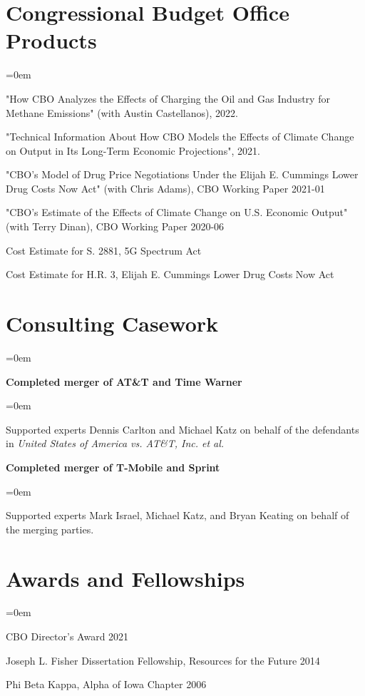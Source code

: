 \documentclass[letterpaper]{article}
\renewenvironment{itemize}{
  \vspace{-0.5em}
  \begin{list}{}{
	\itemsep=0em
    \setlength{\leftmargin}{1.5em}
  }
}{
  \end{list}
}
\begin{document}
\section*{Congressional Budget Office Products}
\begin{itemize}
\item "How CBO Analyzes the Effects of Charging the Oil and Gas Industry for Methane Emissions" (with Austin Castellanos), 2022.
\item "Technical Information About How CBO Models the Effects of Climate Change on Output in Its Long-Term Economic Projections", 2021.
\item "CBO’s Model of Drug Price Negotiations Under the Elijah E. Cummings Lower Drug Costs Now Act" (with Chris Adams), CBO Working Paper 2021-01
\item "CBO’s Estimate of the Effects of Climate Change on U.S. Economic Output" (with Terry Dinan), CBO Working Paper 2020-06
\item Cost Estimate for S. 2881, 5G Spectrum Act
\item Cost Estimate for H.R. 3, Elijah E. Cummings Lower Drug Costs Now Act
\end{itemize}

\section*{Consulting Casework}
\begin{itemize}
\item \textbf{Completed merger of AT\&T and Time Warner}
\begin{itemize}
\item Supported experts Dennis Carlton and Michael Katz on behalf of the defendants in \textit{United States of America vs. AT\&T, Inc. et al.}
\end{itemize}
\item \textbf{Completed merger of T-Mobile and Sprint}
\begin{itemize}
\item Supported experts Mark Israel, Michael Katz, and Bryan Keating on behalf of the merging parties.
\end{itemize}
\end{itemize}

\section*{Awards and Fellowships}
\begin{itemize}
\item CBO Director's Award \hfill 2021
\item Joseph L. Fisher Dissertation Fellowship, Resources for the Future	\hfill 2014
\item Phi Beta Kappa, Alpha of Iowa Chapter	\hfill 2006
\end{itemize}
\end{document}
